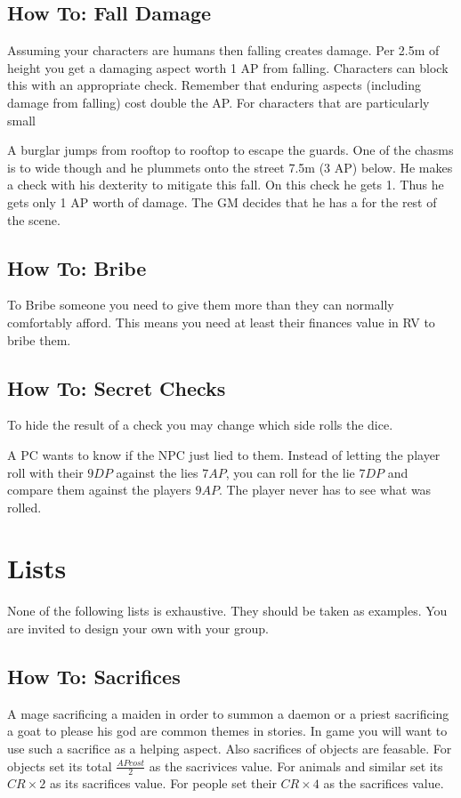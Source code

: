 \documentclass[11pt]{article}
\begin{document}
{\subsection{How To: Fall Damage}
\label{sec:org2e3cc59}
Assuming your characters are humans then falling creates damage. Per 2.5m of height you get a damaging aspect worth 1 AP from falling. Characters can block this with an appropriate check. Remember that enduring aspects (including damage from falling) cost double the AP.
For characters that are particularly small

\begin{pwexample}
A burglar jumps from rooftop to rooftop to escape the guards. One of the chasms is to wide though and he plummets onto the street 7.5m (3 AP) below. He makes a check with his dexterity to mitigate this fall. On this check he gets 1. Thus he gets only 1 AP worth of damage. The GM decides that he has a  for the rest of the scene.
\end{pwexample}
\subsection{How To: Bribe}
\label{sec:org5ed2b59}
To Bribe someone you need to give them more than they can normally comfortably afford. This means you need at least their finances value in RV to bribe them.
\subsection{How To: Secret Checks}
\label{sec:org2447001}
To hide the result of a check you may change which side rolls the dice.

\begin{pwexample}
A PC wants to know if the NPC just lied to them. Instead of letting the player roll with their \(9 DP\) against the lies \(7 AP\), you can roll for the lie \(7 DP\) and compare them against the players \(9 AP\). The player never has to see what was rolled.
\end{pwexample}
\section{Lists}
\label{sec:org9627574}
None of the following lists is exhaustive. They should be taken as examples. You are invited to design your own with your group.
\subsection{How To: Sacrifices}
\label{sec:orgbc265e9}
A mage sacrificing a maiden in order to summon a daemon or a priest sacrificing a goat to please his god are common themes in stories. In game you will want to use such a sacrifice as a helping aspect. Also sacrifices of objects are feasable. For objects set its total \(\frac{AP cost}{2}\) as the sacrivices value. For animals and similar set its \(CR \times 2\) as its sacrifices value. For people set their \(CR \times 4\) as the sacrifices value.
}
\end{document}
